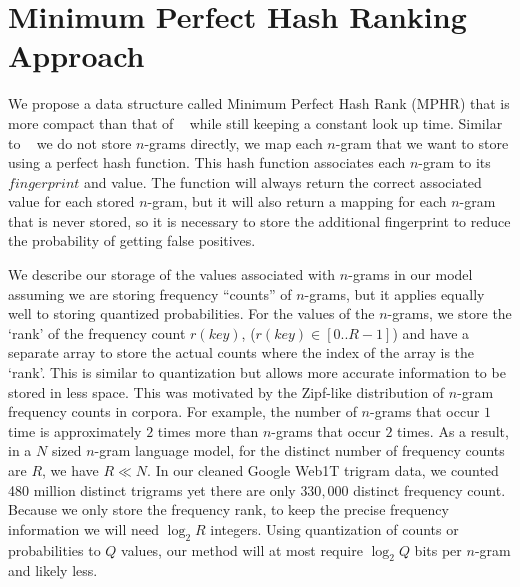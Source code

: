 \documentclass[10pt, a4paper]{article}
\begin{document}
\section{Minimum Perfect Hash Ranking Approach}

We propose a data structure called Minimum Perfect Hash Rank (MPHR) that is more compact than that of 
~ while still keeping a constant look up time. Similar to ~ we do not store $n$-grams directly, we map each $n$-gram that 
we want to store using a perfect hash function.  This hash function associates 
each $n$-gram to its $fingerprint$ and value. The function will always return the correct associated value for each stored $n$-gram, but it will also return a mapping for each $n$-gram that is never stored, so it is necessary to store the additional fingerprint to reduce the probability of getting false positives.


 We describe our storage of the values associated with $n$-grams in our model assuming we are storing frequency ``counts'' of $n$-grams, but it applies equally well to storing quantized probabilities.  For the values of the $n$-grams, we store the `rank' of the frequency
count $r(key)$, ($r(key)\in [0..R-1] $) and have a separate array to store the actual counts where the index of the array is the `rank'. This is similar to quantization but allows more accurate information to be stored in less space.  This was motivated by the Zipf-like distribution of $n$-gram frequency counts in corpora.  For example, the number of $n$-grams that occur $1$ time 
is approximately $2$ times more than $n$-grams that occur $2$ times. 
As a result, in a $N$ sized $n$-gram language model, for the distinct number of 
frequency counts are $R$,  we have $R \ll N$.  In our cleaned Google Web1T trigram data, we counted 480 million distinct trigrams yet there are only $330,000$ distinct frequency count.  Because we only store the frequency rank, to keep the precise frequency information we will need $\log_2{R}$ integers. Using quantization of counts or probabilities to $Q$ values, our method will at most require $\log_2{Q}$ bits per $n$-gram and likely less.
\end{document}

